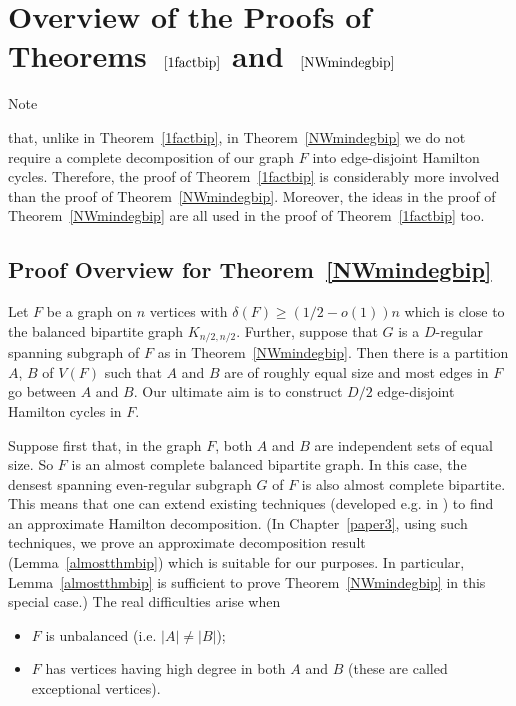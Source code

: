 \documentclass{memo-l}
\def\COMMENT#1{}
\numberwithin{section}{chapter}
\numberwithin{equation}{section}
\numberwithin{firstthm}{section}
\numberwithin{figure}{section}
\begin{document}
{%
\section{Overview of the Proofs of Theorems~$\text{\ref{1factbip}}$ and~$\text{\ref{NWmindegbip}}$}\label{sec:sketch}
Note%
    \COMMENT{Deryk changed this section - so read again}
that, unlike in Theorem~\ref{1factbip}, in Theorem~\ref{NWmindegbip} we do not require a complete
decomposition of our graph $F$ into edge-disjoint Hamilton cycles. Therefore, the proof of Theorem~\ref{1factbip} is considerably more involved than the proof of Theorem~\ref{NWmindegbip}.
Moreover, the ideas in the proof of Theorem~\ref{NWmindegbip} are all used in the proof of Theorem~\ref{1factbip} too.

\subsection{Proof Overview for Theorem~\ref{NWmindegbip}} \label{sec:sketch1}
Let $F$ be a graph on $n$ vertices with $\delta (F) \geq (1/2-o(1))n$ which is close to the balanced
bipartite graph $K_{n/2, n/2}$. Further, suppose that $G$ is a $D$-regular spanning subgraph of $F$
as in Theorem~\ref{NWmindegbip}.
Then there is a partition $A$, $B$ of $V(F)$ such that $A$
and $B$ are of roughly equal size and most edges in $F$ go between $A$ and $B$.
 Our ultimate aim is to construct $D/2$ edge-disjoint Hamilton
cycles in $F$.


Suppose first that, in the graph $F$, both $A$ and $B$ are independent sets of equal size. So
$F$ is an almost complete balanced bipartite graph.
In this case, the densest spanning even-regular subgraph $G$ of $F$ is also almost complete bipartite.
This means that one can extend existing techniques (developed e.g. in \cite{CKO, FKS,fk, HartkeHCs,OS})
to find an approximate Hamilton decomposition.
(In Chapter~\ref{paper3}, using such techniques, we prove an approximate decomposition result (Lemma~\ref{almostthmbip}) which is suitable for our purposes. In particular, Lemma~\ref{almostthmbip} is sufficient to prove Theorem~\ref{NWmindegbip} in this special case.)
The real difficulties arise when
\begin{itemize}
	\item[{\rm (i)}] $F$ is unbalanced (i.e. $|A|\not = |B|$);
	\item[{\rm (ii)}] $F$ has vertices having high degree in both $A$ and $B$ (these are called exceptional vertices).
\end{itemize}

}
\end{document}
